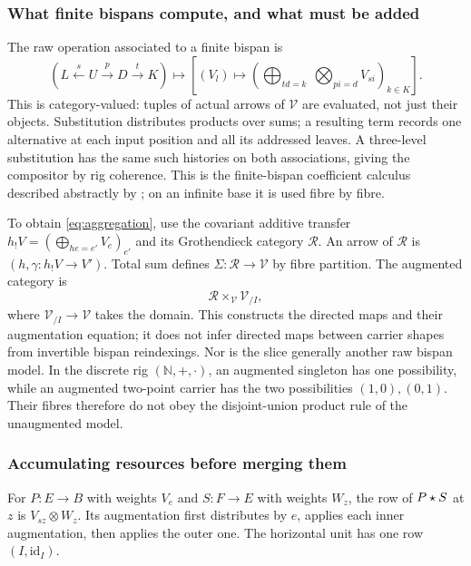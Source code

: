 \documentclass[11pt]{article}
\numberwithin{equation}{section}
\theoremstyle{definition}\newtheorem{definition}[theorem]{Definition}
\newcommand{\V}{\mathcal V}\newcommand{\Set}{\mathsf{Set}}\newcommand{\Cat}{\mathsf{Cat}}
\newcommand{\id}{\mathrm{id}}\newcommand{\op}{\mathrm{op}}\newcommand{\dom}{\mathrm{dom}}\newcommand{\cod}{\mathrm{cod}}
\begin{document}
\subsubsection{What finite bispans compute, and what must be added}
The raw operation associated to a finite bispan is
\begin{equation}\label{eq:bispan}
 \left(L\xleftarrow{s}U\xrightarrow{p}D\xrightarrow{t}K\right)
 \longmapsto
 \left[(V_l)\longmapsto
   \left(\bigoplus_{td=k}\ \bigotimes_{pi=d}V_{si}\right)_{k\in K}\right].
\end{equation}
This is category-valued: tuples of actual arrows of $\V$ are evaluated,
not just their objects. Substitution distributes products over sums;
a resulting term records one alternative at each input position and all
its addressed leaves. A three-level substitution has the same such
histories on both associations, giving the compositor by rig coherence.
This is the finite-bispan coefficient calculus described abstractly by
\cite[Thm.~A]{CHLL}; on an infinite base it is used fibre by fibre.

To obtain \eqref{eq:aggregation}, use the covariant additive transfer
$h_!V=(\bigoplus_{he=e'}V_e)_{e'}$ and its Grothendieck category $\mathcal R$.
An arrow of $\mathcal R$ is $(h,\gamma:h_!V\to V')$. Total sum defines
$\Sigma:\mathcal R\to\V$ by fibre partition. The augmented category is
\[
                 \mathcal R\times_{\V}\V_{/I},
\]
where $\V_{/I}\to\V$ takes the domain. This constructs the directed
maps and their augmentation equation; it does not infer directed maps
between carrier shapes from invertible bispan reindexings. Nor is the
slice generally another raw bispan model. In the discrete rig
$(\mathbb N,+,\cdot)$, an augmented singleton has one possibility, while
an augmented two-point carrier has the two possibilities $(1,0),(0,1)$.
Their fibres therefore do not obey the disjoint-union product rule of
the unaugmented model.

\subsubsection{Accumulating resources before merging them}
For $P:E\to B$ with weights $V_e$ and $S:F\to E$ with weights $W_z$,
the row of $P\mathbin{\star} S$ at $z$ is $V_{sz}\otimes W_z$. Its augmentation
first distributes by $e$, applies each inner augmentation, then applies
the outer one. The horizontal unit has one row $(I,\id_I)$.
\end{document}
